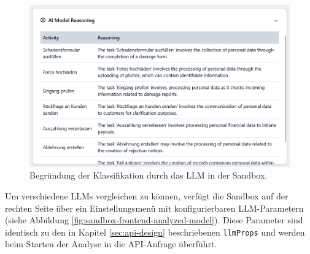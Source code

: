 \begin{figure}
    \centering
    \includegraphics[width=\linewidth]{images/sandbox/sandbox-ai-reasoning}
    \caption{Begründung der Klassifikation durch das LLM in der Sandbox.}
    \label{fig:sandbox-frontend-ai-reasoning}
\end{figure}

Um verschiedene \acp{LLM} vergleichen zu können, verfügt die Sandbox auf der rechten Seite über ein Einstellungsmenü mit konfigurierbaren \ac{LLM}-Parametern (siehe Abbildung \ref{fig:sandbox-frontend-analyzed-model}). Diese Parameter sind identisch zu den in Kapitel \ref{sec:api-design} beschriebenen \texttt{llmProps} und werden beim Starten der Analyse in die API-Anfrage überführt.